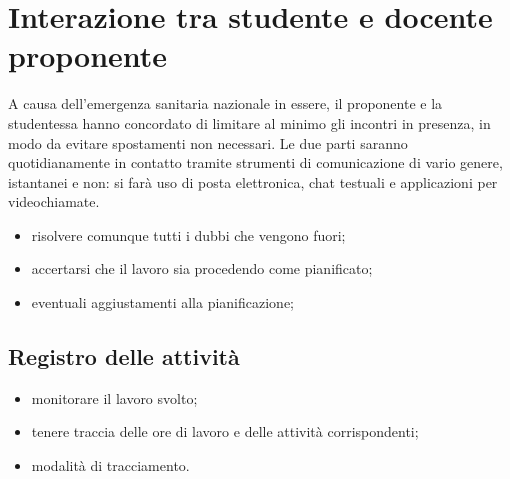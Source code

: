 
\section{Interazione tra studente e docente proponente}
A causa dell'emergenza sanitaria nazionale in essere, il proponente e la studentessa hanno concordato di limitare al minimo gli incontri in presenza, in modo da evitare spostamenti non necessari. Le due parti saranno quotidianamente in contatto tramite strumenti di comunicazione di vario genere, istantanei e non: si farà uso di posta elettronica, chat testuali e applicazioni per videochiamate.

\begin{itemize}
	\item risolvere comunque tutti i dubbi che vengono fuori;
	\item accertarsi che il lavoro sia procedendo come pianificato;
	\item eventuali aggiustamenti alla pianificazione;
\end{itemize}


	\subsection{Registro delle attività}
	\begin{itemize}
		\item monitorare il lavoro svolto;
		\item tenere traccia delle ore di lavoro e delle attività corrispondenti;
		\item modalità di tracciamento.
	\end{itemize}


	

